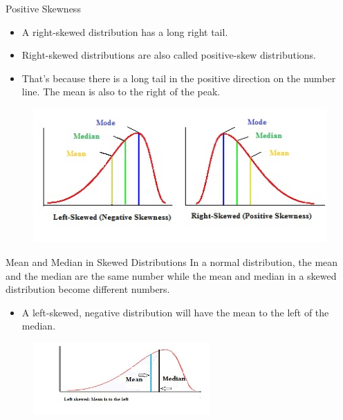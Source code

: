 \begin{frame}[t]{Positive Skewness}
	\begin{itemize}
		\item A right-skewed distribution has a long right tail. 
		\item Right-skewed distributions are also called positive-skew 
		distributions.
		\item That’s because there is a long tail in the positive direction on 
		the number line. The mean is also to the right of the peak.
	\end{itemize}
	
	\begin{figure} [ht]
		\centering
		\includegraphics[trim={6cm 0 0 0}, clip, 
		scale=0.7]{eda/pearson-mode-skewness.jpg}
	\end{figure}
\end{frame}


\begin{frame}[t]{Mean and Median in Skewed Distributions}
	In a normal distribution, the mean and the median are the same 
	number while the mean and median in a skewed distribution become 
	different numbers.
	\begin{itemize}
		\item A left-skewed, negative distribution will have the mean to the 
		left of the median.
	\end{itemize}
	\begin{figure} [ht]
		\centering
		\includegraphics[width=0.6\textwidth]{eda/left-skewed.jpg}
	\end{figure}
\end{frame}

